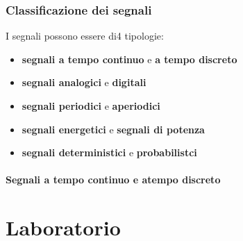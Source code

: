 \documentclass[a4paper, 12pt]{book}
\begin{document}
    \subsection*{Classificazione dei segnali}
    I segnali possono essere di4 tipologie:
    \begin{itemize}
      \item \textbf{segnali a tempo continuo} e \textbf{a tempo discreto}
      \item \textbf{segnali analogici} e \textbf{digitali}
      \item \textbf{segnali periodici} e \textbf{aperiodici}
      \item \textbf{segnali energetici} e \textbf{segnali di potenza}
      \item \textbf{segnali deterministici} e \textbf{probabilistci}
    \end{itemize}

    \subsubsection*{Segnali a tempo continuo e atempo discreto}







    \chapter*{Laboratorio}
\end{document}
